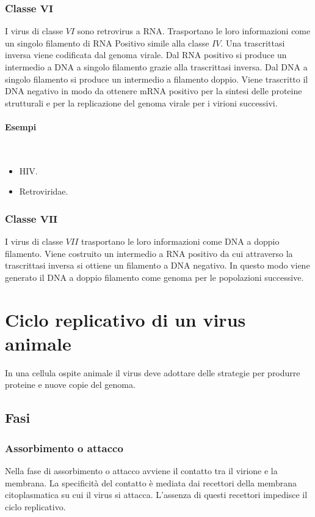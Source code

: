 		\subsubsection{Classe $\mathbf{VI}$}
		I virus di classe $VI$ sono retrovirus a RNA.
		Trasportano le loro informazioni come un singolo filamento di RNA Positivo simile alla classe $IV$.
		Una trascrittasi inversa viene codificata dal genoma virale.
		Dal RNA positivo si produce un intermedio a DNA a singolo filamento grazie alla trascrittasi inversa.
		Dal DNA a singolo filamento si produce un intermedio a filamento doppio.
		Viene trascritto il DNA negativo in modo da ottenere mRNA positivo per la sintesi delle proteine strutturali e per la replicazione del genoma virale per i virioni successivi.
			
			\paragraph{Esempi}\mbox{}\\
			\begin{multicols}{2}
				\begin{itemize}
					\item HIV.
					\item Retroviridae.
				\end{itemize}
			\end{multicols}

		\subsubsection{Classe $\mathbf{VII}$}
		I virus di classe $VII$ trasportano le loro informazioni come DNA a doppio filamento.
		Viene costruito un intermedio a RNA positivo da cui attraverso la trascrittasi inversa si ottiene un filamento a DNA negativo.
		In questo modo viene generato il DNA a doppio filamento come genoma per le popolazioni successive.

\section{Ciclo replicativo di un virus animale}
In una cellula ospite animale il virus deve adottare delle strategie per produrre proteine e nuove copie del genoma.

	\subsection{Fasi}

		\subsubsection{Assorbimento o attacco}
		Nella fase di assorbimento o attacco avviene il contatto tra il virione e la membrana.
		La specificit\`a del contatto \`e mediata dai recettori della membrana citoplasmatica su cui il virus si attacca.
		L'assenza di questi recettori impedisce il ciclo replicativo.

